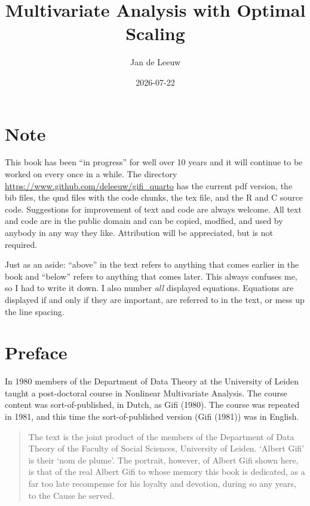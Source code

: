 \documentclass[
  12pt,
  letterpaper,
  DIV=11,
  numbers=noendperiod]{scrreprt}
\title{Multivariate Analysis with Optimal Scaling}
\author{Jan de Leeuw}
\date{2026-07-22}
\renewcommand*\contentsname{Table of contents}
\newcommand\contentsname{Table of contents}
\begin{document}
\maketitle

\renewcommand*\contentsname{Table of contents}
{
\setcounter{tocdepth}{2}
\tableofcontents
}


\chapter*{Note}\label{note}


This book has been ``in progress'' for well over 10 years and it will
continue to be worked on every once in a while. The directory
\url{https://www.github.com/deleeuw/gifi_quarto} has the current pdf
version, the bib files, the qmd files with the code chunks, the tex
file, and the R and C source code. Suggestions for improvement of text
and code are always welcome. All text and code are in the public domain
and can be copied, modfied, and used by anybody in any way they like.
Attribution will be appreciated, but is not required.

Just as an aside: ``above'' in the text refers to anything that comes
earlier in the book and ``below'' refers to anything that comes later.
This always confuses me, so I had to write it down. I also number
\emph{all} displayed equations. Equations are displayed if and only if
they are important, are referred to in the text, or mess up the line
spacing.


\chapter*{Preface}\label{preface}


In 1980 members of the Department of Data Theory at the University of
Leiden taught a post-doctoral course in Nonlinear Multivariate Analysis.
The course content was sort-of-published, in Dutch, as Gifi (1980). The
course was repeated in 1981, and this time the sort-of-published version
(Gifi (1981)) was in English.

\begin{quote}
The text is the joint product of the members of the Department of Data
Theory of the Faculty of Social Sciences, University of Leiden. `Albert
Gifi' is their `nom de plume'. The portrait, however, of Albert Gifi
shown here, is that of the real Albert Gifi to whose memory this book is
dedicated, as a far too late recompense for his loyalty and devotion,
during so any years, to the Cause he served.
\end{quote}
\end{document}
